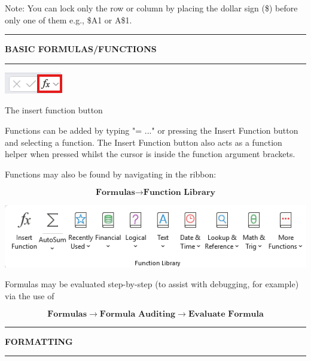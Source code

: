 \documentclass[8pt]{extarticle}
\newcommand{\heading}[1]{%
    \noindent
    \rule{\linewidth}{0.4pt}
    \begin{center}
        \vspace{-1ex}
        \textbf{#1}        
        \vspace{-2.5ex}
    \end{center}
    \rule{\linewidth}{0.4pt}
}
\begin{document}
\begin{multicols}{3}
\begin{tcolorbox}[width=\columnwidth, colback=white!95!black]
Note: You can lock only the row or column by placing the dollar sign (\$) before only one of them e.g., \$A1 or A\$1.
\end{tcolorbox}

\columnbreak
\heading{BASIC FORMULAS/FUNCTIONS}


\begin{center}
    \includegraphics{images/insert_function.png}
    
    The insert function button
\end{center}

Functions can be added by typing "= ..." or pressing the Insert Function button and selecting a function. The Insert Function button also acts as a function helper when pressed whilst the cursor is inside the function argument brackets. 

Functions may also be found by navigating in the ribbon:

\[    \textbf{Formulas} \rightarrow \textbf{Function Library}\]

\begin{center}
    \includegraphics[width=\columnwidth]{images/function_library.png}
\end{center}

Formulas may be evaluated step-by-step (to assist with debugging, for example) via the use of 

\[    \textbf{Formulas} \rightarrow \textbf{Formula Auditing} \rightarrow \textbf{Evaluate Formula}\]

\heading{FORMATTING}


\end{multicols}
\end{document}
